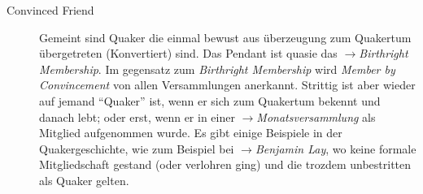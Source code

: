 \begin{description}
 \item[Convinced Friend] Gemeint sind Quaker die einmal bewust aus überzeugung
zum Quakertum übergetreten (Konvertiert) sind. Das Pendant ist quasie das
$\to$\textit{Birthright Membership}. Im gegensatz zum \textit{Birthright
Membership} wird \textit{Member by Convincement} von allen Versammlungen
anerkannt. Strittig ist aber wieder auf jemand "`Quaker"' ist, wenn er sich zum
Quakertum bekennt und danach lebt; oder erst, wenn er in einer
$\to$\textit{Monatsversammlung} als Mitglied aufgenommen wurde. Es gibt einige
Beispiele in der Quakergeschichte, wie zum Beispiel bei $\to$\textit{Benjamin
Lay}, wo keine formale Mitgliedschaft gestand (oder verlohren ging) und die
trozdem unbestritten als Quaker gelten.


 \end{description}

\normalsize